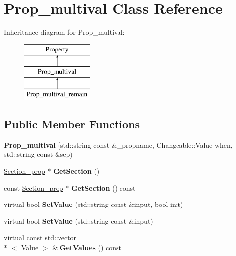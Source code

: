 \hypertarget{classProp__multival}{\section{Prop\-\_\-multival Class Reference}
\label{classProp__multival}
}
Inheritance diagram for Prop\-\_\-multival\-:\begin{figure}[H]
\begin{center}
\leavevmode
\includegraphics[height=3.000000cm]{classProp__multival}
\end{center}
\end{figure}
\subsection*{Public Member Functions}
\begin{DoxyCompactItemize}
\item 
\hypertarget{classProp__multival_aa579fe534016bb823422f77b42159f15}{{\bfseries Prop\-\_\-multival} (std\-::string const \&\-\_\-propname, Changeable\-::\-Value when, std\-::string const \&sep)}\label{classProp__multival_aa579fe534016bb823422f77b42159f15}

\item 
\hypertarget{classProp__multival_a1856ec3db2ba38e9a36564e5857ea905}{\hyperlink{classSection__prop}{Section\-\_\-prop} $\ast$ {\bfseries Get\-Section} ()}\label{classProp__multival_a1856ec3db2ba38e9a36564e5857ea905}

\item 
\hypertarget{classProp__multival_a3fbc56edc9f80a60ddb42f1e583a4449}{const \hyperlink{classSection__prop}{Section\-\_\-prop} $\ast$ {\bfseries Get\-Section} () const }\label{classProp__multival_a3fbc56edc9f80a60ddb42f1e583a4449}

\item 
\hypertarget{classProp__multival_a0bd9f14f80843923d080c5761250c453}{virtual bool {\bfseries Set\-Value} (std\-::string const \&input, bool init)}\label{classProp__multival_a0bd9f14f80843923d080c5761250c453}

\item 
\hypertarget{classProp__multival_a9aab89f6735b3c055d991fed7b622b91}{virtual bool {\bfseries Set\-Value} (std\-::string const \&input)}\label{classProp__multival_a9aab89f6735b3c055d991fed7b622b91}

\item 
\hypertarget{classProp__multival_a43e392ad0991abeae9a08fd330b95da7}{virtual const std\-::vector\\*
$<$ \hyperlink{classValue}{Value} $>$ \& {\bfseries Get\-Values} () const }\label{classProp__multival_a43e392ad0991abeae9a08fd330b95da7}

\end{DoxyCompactItemize}
